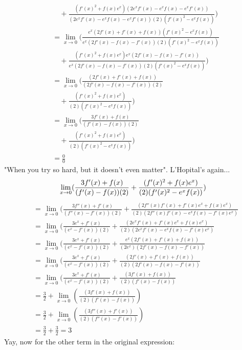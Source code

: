 \documentclass{article}
\begin{document}
\begin{enumerate}[label=\alph*.)]
\begin{align*}
&\quad + \frac{(f'(x)^2 + f(x)e^x)(2e^xf'(x) - e^xf(x) - e^xf'(x))}{(2e^xf'(x) - e^xf(x) - e^xf'(x))(2)(f'(x)^2 - e^xf(x))}) \\
&=  \lim_{x \rightarrow 0}(\frac{e^x(2f'(x) + f'(x) + f(x))(f'(x)^2 - e^xf(x))}{e^x(2f'(x) - f(x) - f'(x))(2)(f'(x)^2 - e^xf(x))} \\
&\quad + \frac{(f'(x)^2 + f(x)e^x)e^x(2f'(x) - f(x) - f'(x))}{e^x(2f'(x) - f(x) - f'(x))(2)(f'(x)^2 - e^xf(x))}) \\
&=  \lim_{x \rightarrow 0}(\frac{(2f'(x) + f'(x) + f(x))}{(2f'(x) - f(x) - f'(x))(2)} \\
&\quad + \frac{(f'(x)^2 + f(x)e^x)}{(2)(f'(x)^2 - e^xf(x))}) \\
&=  \lim_{x \rightarrow 0}(\frac{3f'(x) + f(x)}{(f'(x) - f(x))(2)} \\
&\quad + \frac{(f'(x)^2 + f(x)e^x)}{(2)(f'(x)^2 - e^xf(x))}) \\
&= \frac{0}{0}
\end{align*}
"When you try so hard, but it doesn't even matter". L'Hopital's again...\\
\[
\lim_{x \rightarrow 0}(\frac{3f'(x) + f(x)}{(f'(x) - f(x))(2)}+ \frac{(f'(x)^2 + f(x)e^x)}{(2)(f'(x)^2 - e^xf(x))}) \\
\]
\begin{align*}
&= \lim_{x \rightarrow 0}(\frac{3f''(x) + f'(x)}{(f''(x) - f'(x))(2)}+ \frac{(2f''(x)f'(x) + f'(x)e^x + f(x)e^x)}{(2)(2f''(x)f'(x) - e^xf(x) - f'(x)e^x)} \\
&= \lim_{x \rightarrow 0}(\frac{3e^x + f'(x)}{(e^x - f'(x))(2)}+ \frac{(2e^xf'(x) + f'(x)e^x + f(x)e^x)}{(2)(2e^xf'(x) - e^xf(x) - f'(x)e^x)} \\
&= \lim_{x \rightarrow 0}(\frac{3e^x + f'(x)}{(e^x - f'(x))(2)}+ \frac{e^x(2f'(x) + f'(x) + f(x))}{(2e^x)(2f'(x) - f(x) - f'(x))} \\
&= \lim_{x \rightarrow 0}(\frac{3e^x + f'(x)}{(e^x - f'(x))(2)}+ \frac{(2f'(x) + f'(x) + f(x))}{(2)(2f'(x) - f(x) - f'(x))} \\
&= \lim_{x \rightarrow 0}(\frac{3e^x + f'(x)}{(e^x - f'(x))(2)}+ \frac{(3f'(x) + f(x))}{(2)(f'(x) - f(x))} \\
&= \frac{3}{2}  + \lim_{x \rightarrow 0} (\frac{(3f'(x) + f(x))}{(2)(f'(x) - f(x))})\\
&= \frac{3}{2}  + \lim_{x \rightarrow 0} (\frac{(3f''(x) + f'(x))}{(2)(f''(x) - f'(x))}) \\
&= \frac{3}{2}  + \frac{3}{2} = 3
\end{align*}
Yay, now for the other term in the original expression: \\

\end{enumerate}
\end{document}
